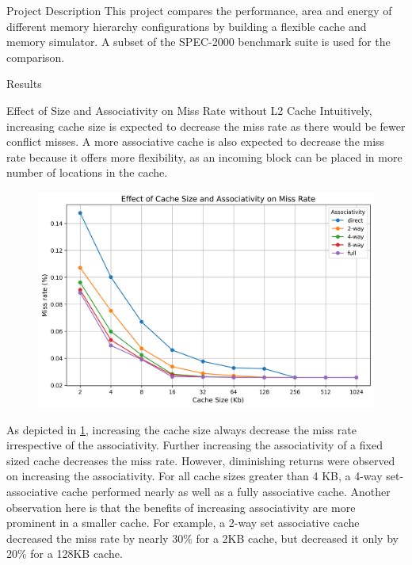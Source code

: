 \begin{section}{Project Description}
This project compares the performance, area and energy of different memory hierarchy configurations by building a flexible cache and memory simulator. A subset of the SPEC-2000 benchmark suite is used for the comparison.
\end{section}


\begin{section}{Results}

    \begin{subsection}{Effect of Size and Associativity on Miss Rate without L2 Cache}
    Intuitively, increasing cache size is expected to decrease the miss rate as there would be fewer conflict misses. A more associative cache is also expected to decrease the miss rate because it offers more flexibility, as an incoming block can be placed in more number of locations in the cache.

    \begin{figure}[h]
        \includegraphics[width=\textwidth]{figures/fig1/fig1.png}
        \centering
        \label{fig:fig1}
    \end{figure}

    As depicted in \ref{fig:fig1}, increasing the cache size always decrease the miss rate irrespective of the associativity. Further increasing the  associativity of a fixed sized cache decreases the miss rate. However, diminishing returns were observed on increasing the associativity. For all cache sizes greater than 4 KB, a 4-way set-associative cache performed nearly as well as a fully associative cache. Another observation here is that the benefits of increasing associativity are more prominent in a smaller cache. For example, a 2-way set associative cache decreased the miss rate by nearly 30\% for a 2KB cache, but decreased it only by 20\% for a 128KB cache.


\end{subsection}
\end{section}
